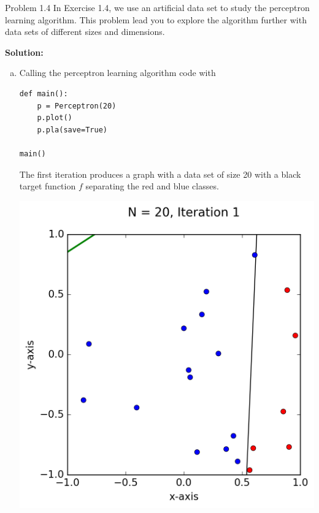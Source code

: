 \documentclass[a4paper]{article}
\begin{document}
\begin {description}
\begin{doublespace}
\begin{enumerate}[(a)]
\begin{center}
\end{center}
\end{enumerate}
\end{doublespace}

\item[Problem 1.4] In Exercise 1.4, we use an artificial data set to study the perceptron learning algorithm. This problem lead you to explore the algorithm further with data sets of different sizes and dimensions.

\smallskip

\textbf{Solution:}
\begin{doublespace}
\begin{enumerate}[(a)]

\item Calling the perceptron learning algorithm code \cite{HB98} with

\begin{lstlisting}[frame=single]
def main():
    p = Perceptron(20)
    p.plot()
    p.pla(save=True)

main()
\end{lstlisting}

The first iteration produces a graph with a data set of size 20 with a black target function $f$ separating the red and blue classes.

\begin{center}
\includegraphics{Problem_4a.png}
\end{center}


\end{enumerate}
\end{doublespace}
\end{description}
\end{document}
